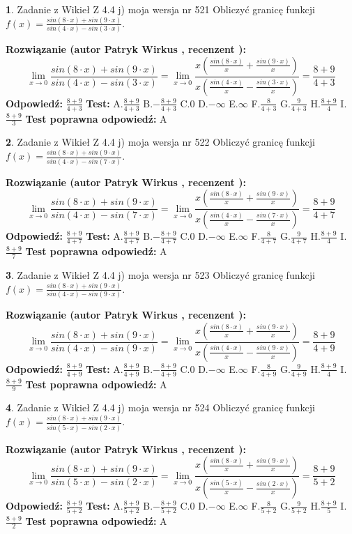 \documentclass[12pt, a4paper]{article}
\theoremstyle{definition} %
\newtheorem{zad}{}
\newcommand{\zadStart}[1]{\begin{zad}#1\newline}
\newcommand{\zadStop}{\end{zad}}
\newcommand{\rozwStart}[2]{\noindent \textbf{Rozwiązanie (autor #1 , recenzent #2): }\newline}
\newcommand{\rozwStop}{\newline}
\newcommand{\odpStart}{\noindent \textbf{Odpowiedź:}\newline}
\newcommand{\odpStop}{\newline}
\newcommand{\testStart}{\noindent \textbf{Test:}\newline}
\newcommand{\testStop}{\newline}
\newcommand{\kluczStart}{\noindent \textbf{Test poprawna odpowiedź:}\newline}
\newcommand{\kluczStop}{\newline}
\begin{document}
\zadStart{Zadanie z Wikieł Z 4.4 j) moja wersja nr 521}
Obliczyć granicę funkcji $f(x)=\frac{sin(8\cdot x) +sin(9\cdot x)}{sin(4\cdot x) -sin(3\cdot x)}$.
\zadStop
\rozwStart{Patryk Wirkus}{}
$$\lim\limits_{x\to 0}\frac{sin(8\cdot x) +sin(9\cdot x)}{sin(4\cdot x) -sin(3\cdot x)}=\lim\limits_{x\to 0}\frac{x(\frac{sin(8\cdot x)}{x}+\frac{sin(9\cdot x)}{x})}{x(\frac{sin(4\cdot x)}{x}-\frac{sin(3\cdot x)}{x})}=\frac{8+9}{4+3}$$
\rozwStop
\odpStart
$\frac{8+9}{4+3}$
\odpStop
\testStart
A.$\frac{8+9}{4+3}$
B.$-\frac{8+9}{4+3}$
C.$0$
D.$-\infty$
E.$\infty$
F.$\frac{8}{4+3}$
G.$\frac{9}{4+3}$
H.$\frac{8+9}{4}$
I.$\frac{8+9}{3}$
\testStop
\kluczStart
A
\kluczStop



\zadStart{Zadanie z Wikieł Z 4.4 j) moja wersja nr 522}
Obliczyć granicę funkcji $f(x)=\frac{sin(8\cdot x) +sin(9\cdot x)}{sin(4\cdot x) -sin(7\cdot x)}$.
\zadStop
\rozwStart{Patryk Wirkus}{}
$$\lim\limits_{x\to 0}\frac{sin(8\cdot x) +sin(9\cdot x)}{sin(4\cdot x) -sin(7\cdot x)}=\lim\limits_{x\to 0}\frac{x(\frac{sin(8\cdot x)}{x}+\frac{sin(9\cdot x)}{x})}{x(\frac{sin(4\cdot x)}{x}-\frac{sin(7\cdot x)}{x})}=\frac{8+9}{4+7}$$
\rozwStop
\odpStart
$\frac{8+9}{4+7}$
\odpStop
\testStart
A.$\frac{8+9}{4+7}$
B.$-\frac{8+9}{4+7}$
C.$0$
D.$-\infty$
E.$\infty$
F.$\frac{8}{4+7}$
G.$\frac{9}{4+7}$
H.$\frac{8+9}{4}$
I.$\frac{8+9}{7}$
\testStop
\kluczStart
A
\kluczStop



\zadStart{Zadanie z Wikieł Z 4.4 j) moja wersja nr 523}
Obliczyć granicę funkcji $f(x)=\frac{sin(8\cdot x) +sin(9\cdot x)}{sin(4\cdot x) -sin(9\cdot x)}$.
\zadStop
\rozwStart{Patryk Wirkus}{}
$$\lim\limits_{x\to 0}\frac{sin(8\cdot x) +sin(9\cdot x)}{sin(4\cdot x) -sin(9\cdot x)}=\lim\limits_{x\to 0}\frac{x(\frac{sin(8\cdot x)}{x}+\frac{sin(9\cdot x)}{x})}{x(\frac{sin(4\cdot x)}{x}-\frac{sin(9\cdot x)}{x})}=\frac{8+9}{4+9}$$
\rozwStop
\odpStart
$\frac{8+9}{4+9}$
\odpStop
\testStart
A.$\frac{8+9}{4+9}$
B.$-\frac{8+9}{4+9}$
C.$0$
D.$-\infty$
E.$\infty$
F.$\frac{8}{4+9}$
G.$\frac{9}{4+9}$
H.$\frac{8+9}{4}$
I.$\frac{8+9}{9}$
\testStop
\kluczStart
A
\kluczStop



\zadStart{Zadanie z Wikieł Z 4.4 j) moja wersja nr 524}
Obliczyć granicę funkcji $f(x)=\frac{sin(8\cdot x) +sin(9\cdot x)}{sin(5\cdot x) -sin(2\cdot x)}$.
\zadStop
\rozwStart{Patryk Wirkus}{}
$$\lim\limits_{x\to 0}\frac{sin(8\cdot x) +sin(9\cdot x)}{sin(5\cdot x) -sin(2\cdot x)}=\lim\limits_{x\to 0}\frac{x(\frac{sin(8\cdot x)}{x}+\frac{sin(9\cdot x)}{x})}{x(\frac{sin(5\cdot x)}{x}-\frac{sin(2\cdot x)}{x})}=\frac{8+9}{5+2}$$
\rozwStop
\odpStart
$\frac{8+9}{5+2}$
\odpStop
\testStart
A.$\frac{8+9}{5+2}$
B.$-\frac{8+9}{5+2}$
C.$0$
D.$-\infty$
E.$\infty$
F.$\frac{8}{5+2}$
G.$\frac{9}{5+2}$
H.$\frac{8+9}{5}$
I.$\frac{8+9}{2}$
\testStop
\kluczStart
A
\kluczStop
\end{document}

